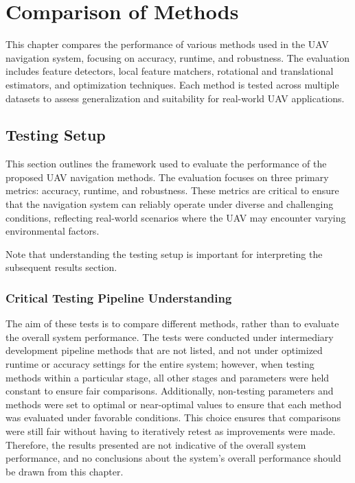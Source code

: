 \chapter{Comparison of Methods}
\label{chap:Testing}

\vspace{-1cm}

This chapter compares the performance of various methods used in the UAV navigation system, focusing on accuracy, runtime, and robustness. The evaluation includes feature detectors, local feature matchers, rotational and translational estimators, and optimization techniques. Each method is tested across multiple datasets to assess generalization and suitability for real-world UAV applications.


\vspace{-0.5cm}
\section{Testing Setup}
\vspace{-0.25cm}


This section outlines the framework used to evaluate the performance of the proposed UAV navigation methods. The evaluation focuses on three primary metrics: accuracy, runtime, and robustness. These metrics are critical to ensure that the navigation system can reliably operate under diverse and challenging conditions, reflecting real-world scenarios where the UAV may encounter varying environmental factors.

Note that understanding the testing setup is important for interpreting the subsequent results section.

\subsection{Critical Testing Pipeline Understanding}

The aim of these tests is to compare different methods, rather than to evaluate the overall system performance. The tests were conducted under intermediary development pipeline methods that are not listed, and not under optimized runtime or accuracy settings for the entire system; however, when testing methods within a particular stage, all other stages and parameters were held constant to ensure fair comparisons. Additionally, non-testing parameters and methods were set to optimal or near-optimal values to ensure that each method was evaluated under favorable conditions. This choice ensures that comparisons were still fair without having to iteratively retest as improvements were made. Therefore, the results presented are not indicative of the overall system performance, and no conclusions about the system's overall performance should be drawn from this chapter.

